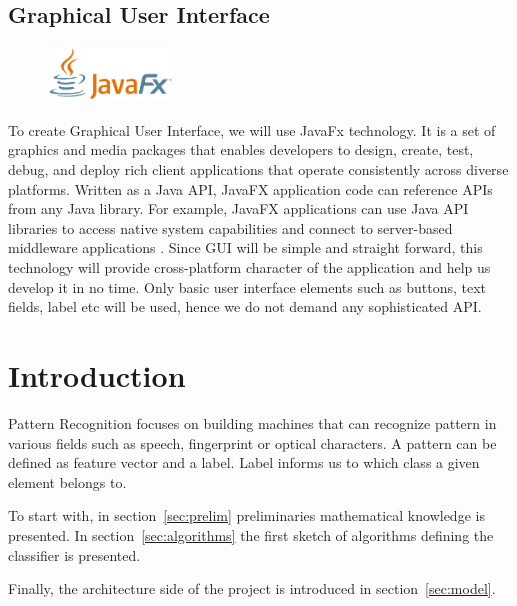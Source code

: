 \documentclass{article}
\begin{document}
\subsection{Graphical User Interface}

\begin{figure}
  \begin{center}
    \includegraphics[width=0.3\textwidth]{images/javafx_logo.png}
  \end{center}
\end{figure}

To create Graphical User Interface, we will use JavaFx technology. It is a set of graphics and media packages that enables developers to design, create, test, debug, and deploy rich client applications that operate consistently across diverse platforms. Written as a Java API, JavaFX application code can reference APIs from any Java library. For example, JavaFX applications can use Java API libraries to access native system capabilities and connect to server-based middleware applications \cite{javafx_description}. Since GUI will be simple and straight forward, this technology will provide cross-platform character of the application and help us develop it in no time. Only basic user interface elements such as buttons, text fields, label etc will be used, hence we do not demand any sophisticated API.


\section{Introduction}
Pattern Recognition focuses on building machines that can recognize pattern in various fields such as speech, fingerprint or optical characters. A pattern can be defined as feature vector and a label. Label informs us to which class a given element belongs to.

To start with, in section~\ref{sec:prelim} preliminaries mathematical knowledge is presented. In section~\ref{sec:algorithms} the first sketch of algorithms defining the classifier is presented.

Finally, the architecture side of the project is introduced in section~\ref{sec:model}.
\end{document}
